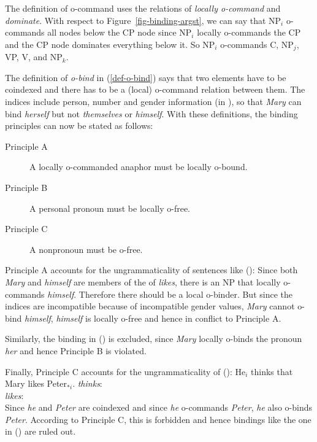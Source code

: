 \documentclass[output=paper
 	        ,biblatex
                ,babelshorthands
                ,newtxmath
                ,draftmode
                ,colorlinks, citecolor=brown
]{langscibook}
\begin{document}
The definition of o-command uses the relations of \emph{locally o-command} and \emph{dominate}. With respect to
Figure~\ref{fig-binding-argst}, we can say that NP$_i$ o-commands all nodes below the CP node since
NP$_i$ locally o-commands the CP and the CP node dominates everything below it. So NP$_i$ o-commands
C, NP$_j$, VP, V, and NP$_k$.

The definition of \emph{o-bind} in (\ref{def-o-bind}) says that two elements have to be coindexed
and there has to be a (local) o-command relation between them. The indices include person, number
and gender information (in ), so that \emph{Mary} can bind \emph{herself} but not
\emph{themselves} or \emph{himself}. With these definitions, the binding principles can now be stated
as follows:

\begin{principle-break}
\begin{description}
\item [Principle A] A locally o-commanded anaphor must be locally o-bound.
\item [Principle B] A personal pronoun must be locally o-free.
\item [Principle C] A nonpronoun must be o-free.
\end{description}
\end{principle-break}

\noindent
Principle A accounts for the ungrammaticality of sentences like ():
\eal
{}
\zl
Since both \emph{Mary} and \emph{himself} are members of the \argstl of \emph{likes}, there is an NP
that locally o-commands \emph{himself}. Therefore there should be a local o-binder. But since the
indices are incompatible because of incompatible gender values, \emph{Mary} cannot o-bind
\emph{himself}, \emph{himself} is locally o-free and hence in conflict to Principle A.

Similarly, the binding in () is excluded, since \emph{Mary} locally o-binds the pronoun \emph{her}
and hence Principle B is violated.
\eal
{}
\zl

\noindent
Finally, Principle C accounts for the ungrammaticality of ():
\eal
\ex He$_i$ thinks that Mary likes Peter$_{*i}$.
\ex \emph{thinks}:\\
\argst {}
\ex \emph{likes}:\\
\argst {}
\zl
Since \emph{he} and \emph{Peter} are coindexed and since \emph{he} o-commands \emph{Peter},
\emph{he} also o-binds \emph{Peter}. According to Principle C, this is forbidden and hence bindings
like the one in () are ruled out.
\end{document}
